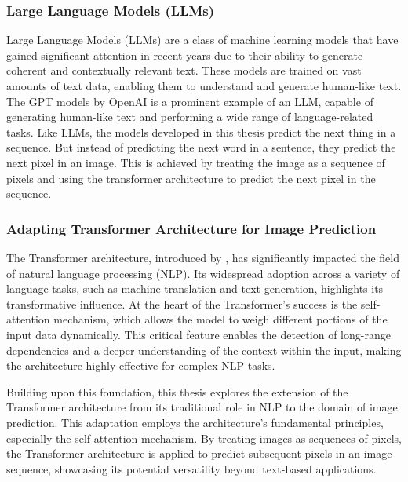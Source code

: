     \subsubsection{Large Language Models (LLMs)}

    Large Language Models (LLMs) are a class of machine learning models that have gained significant attention in recent years due to their ability to generate coherent and contextually relevant text. These models are trained on vast amounts of text data, enabling them to understand and generate human-like text. The GPT models by OpenAI \autocite{GPT2radford2019} is a prominent example of an LLM, capable of generating human-like text and performing a wide range of language-related tasks. Like LLMs, the models developed in this thesis predict the next thing in a sequence. But instead of predicting the next word in a sentence, they predict the next pixel in an image. This is achieved by treating the image as a sequence of pixels and using the transformer architecture to predict the next pixel in the sequence.

    \subsubsection{Adapting Transformer Architecture for Image Prediction}

    The Transformer architecture, introduced by \autocite{vaswani2023attention}, has significantly impacted the field of natural language processing (NLP). Its widespread adoption across a variety of language tasks, such as machine translation and text generation, highlights its transformative influence. At the heart of the Transformer's success is the self-attention mechanism, which allows the model to weigh different portions of the input data dynamically. This critical feature enables the detection of long-range dependencies and a deeper understanding of the context within the input, making the architecture highly effective for complex NLP tasks.

    Building upon this foundation, this thesis explores the extension of the Transformer architecture from its traditional role in NLP to the domain of image prediction. This adaptation employs the architecture's fundamental principles, especially the self-attention mechanism. By treating images as sequences of pixels, the Transformer architecture is applied to predict subsequent pixels in an image sequence, showcasing its potential versatility beyond text-based applications.
    
